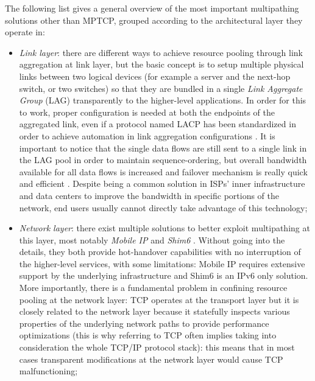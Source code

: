 The following list gives a general overview of the most important multipathing solutions other than MPTCP, grouped according to the architectural layer they operate in:
\begin{itemize}
  \item \textit{Link layer}: there are different ways to achieve resource pooling through link aggregation at link layer, but the basic concept is to setup multiple physical links between two logical devices (for example a server and the next-hop switch, or two switches) so that they are bundled in a single \textit{Link Aggregate Group} (LAG) transparently to the higher-level applications. In order for this to work, proper configuration is needed at both the endpoints of the aggregated link, even if a protocol named LACP has been standardized in order to achieve automation in link aggregation configurations \cite{thenetworkway}. It is important to notice that the single data flows are still sent to a single link in the LAG pool in order to maintain sequence-ordering, but overall bandwidth available for all data flows is increased and failover mechanism is really quick and efficient \cite{thenetworkway}. Despite being a common solution in ISPs' inner infrastructure and data centers to improve the bandwidth in specific portions of the network, end users usually cannot directly take advantage of this technology;
  \item \textit{Network layer}: there exist multiple solutions to better exploit multipathing at this layer, most notably \textit{Mobile IP} \cite{rfc5944} and \textit{Shim6} \cite{rfc5533}. Without going into the details, they both provide hot-handover capabilities with no interruption of the higher-level services, with some limitations: Mobile IP requires extensive support by the underlying infrastructure and Shim6 is an IPv6 only solution. More importantly, there is a fundamental problem in confining resource pooling at the network layer: TCP operates at the transport layer but it is closely related to the network layer because it statefully inspects various properties of the underlying network paths to provide performance optimizations (this is why referring to TCP often implies taking into consideration the whole TCP/IP protocol stack): this means that in most cases transparent modifications at the network layer would cause TCP malfunctioning;

\end{itemize}
